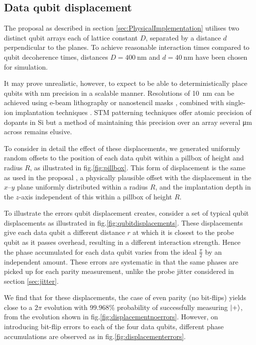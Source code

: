 
\subsection{Data qubit displacement}
The proposal \cite{OGorman2016} as described in section \ref{sec:PhysicalImplementation} utilises two distinct qubit arrays each of lattice constant $D$, separated by a distance $d$ perpendicular to the planes. To achieve reasonable interaction times compared to qubit decoherence times, distances $D = \SI{400}{\nano\metre}$ and $d = \SI{40}{\nano\metre}$ have been chosen for simulation.

It may prove unrealistic, however, to expect to be able to deterministically place qubits with \si{\nano\metre} precision in a scalable manner. Resolutions of \SI{10}{\nano\metre} can be achieved using e-beam lithography \cite{Vieu2000a} or nanostencil masks \cite{Weis2008}, combined with single-ion implantation techniques \cite{Jamieson2005}. STM patterning techniques offer atomic precision of dopants in Si \cite{Schofield2003} but a method of maintaining this precision over an array several \si{\micro\metre} across remains elusive. 

To consider in detail the effect of these displacements, we generated uniformly random offsets to the position of each data qubit within a pillbox of height and radius $R$, as illustrated in fig.\@ \ref{fig:pillbox}. This form of displacement is the same as used in the proposal \cite{OGorman2016}, a physically plausible offset with the displacement in the $x$--$y$ plane uniformly distributed within a radius $R$, and the implantation depth in the $z$-axis independent of this within a pillbox of height $R$.

To illustrate the errors qubit displacement creates, consider a set of typical qubit displacements as illustrated in fig.\@ \ref{fig:qubitdisplacements}. These displacements give each data qubit a different distance $r$ at which it is closest to the probe qubit as it passes overhead, resulting in a different interaction strength. Hence the phase accumulated for each data qubit varies from the ideal $\tfrac{\pi}{2}$ by an independent amount. These errors are systematic in that the same phases are picked up for each parity measurement, unlike the probe jitter considered in section \ref{sec:jitter}.

We find that for these displacements, the case of even parity (no bit-flips) yields close to a $2\pi$ evolution with $99.968\%$ probability of successfully measuring $\ket{+}$, from the evolution shown in fig.\@ \ref{fig:displacementnoerrors}. However, on introducing bit-flip errors to each of the four data qubits, different phase accumulations are observed as in fig.\@ \ref{fig:displacementerrors}.


